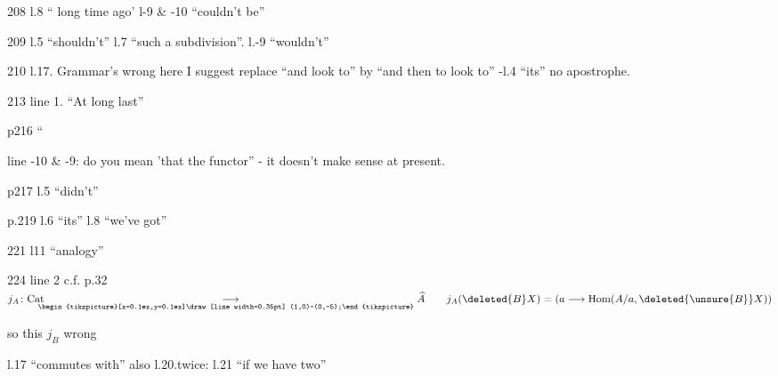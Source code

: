 208 l.8 `` long time ago' l-9 \& -10 ``couldn't be''

209 l.5 ``shouldn't'' l.7 ``such a subdivision''. l.-9 ``wouldn't''

210 l.17. Grammar's wrong here I suggest replace ``and look to'' by ``and then to look to'' -l.4 ``its'' no apostrophe.

213 line 1. ``At long last''

p216  `` 

line -10 \& -9: do you mean 'that the functor'' - it doesn't make sense at present.

p217 l.5 ``didn't''

p.219 l.6 ``its'' l.8 ``we've got''

221 l11 ``analogy''

224 line 2 c.f. p.32 $j_A\colon\mathrm{Cat}\mathrel{\underset{\text{\hspace{-1.1em}\begin{tikzpicture}[x=0.1ex,y=0.1ex]\draw[line width=0.35pt] (1,0)--(0,-5);\end{tikzpicture}}}{\longrightarrow}}\widehat A\qquad j_A(\deleted{B}X)=(a\longrightarrow\operatorname{Hom}(A/a,\deleted{\unsure{B}}X))$

\quad so  this  $j_B$   wrong

l.17 ``commutes with'' also l.20.twice: l.21 ``if we have two''


